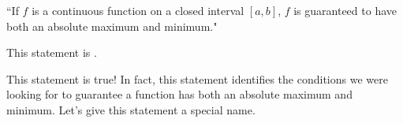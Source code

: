 \documentclass{ximera}
\begin{document}
\begin{exercise}
\begin{center} ``If $f$ is a continuous function on a closed interval $[a,b]$, $f$ is guaranteed to have both an absolute maximum and minimum." \end{center}

This statement is .

\begin{feedback}[correct]
This statement is true!  In fact, this statement identifies the conditions we were looking for to guarantee a function has both an absolute maximum and minimum.  Let's give this statement a special name. 
\end{feedback}
\end{exercise}
\end{document}
